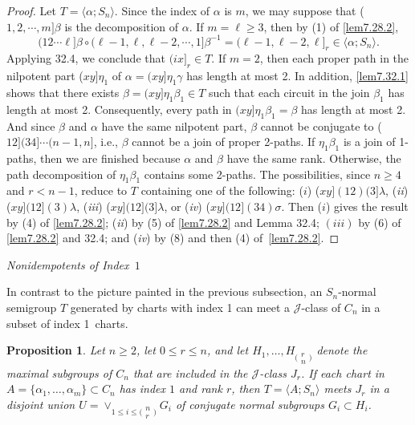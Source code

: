 \documentclass{surv-l}
\numberwithin{equation}{section}
\numberwithin{table}{section}
\numberwithin{figure}{section}
\newtheorem{proposition}[equation]{Proposition}
\theoremstyle{definition}
\begin{document}
\begin{proof} Let $T=\langle \alpha;S_{n}\rangle$. Since the index of $\alpha$ is
$m$, we may suppose that ($1, 2,\cdots,  m]\beta$ is the
decomposition of $\alpha$. If $m=\ell\geq 3$, then by (1) of
\ref{lem7.28.2},
\[
(12\cdots \ell]\beta\circ(\ell-1, \ell, \ell-2, \cdots, 1]\beta^{-1}=(\ell-1,
\ell-2, \ell]_{r}\in\langle\alpha;S_{n}\rangle.
\]
Applying 32.4, we conclude that $(ix]_{r}\in T$. If $m=2$, then
each proper path in the nilpotent part ($xy]\eta_{1}$ of
$\alpha=(xy]\eta_{1}\gamma$ has length at most 2. In addition,
\ref{lem7.32.1} shows that there exists
$\beta=(xy]\eta_{1}\beta_{1}\in T$ such that each circuit in the
join $\beta_{1}$ has length at most 2. Consequently, every path in
$(xy]\eta_{1}\beta_{1}=\beta$ has length at most 2. And since
$\beta$ and $\alpha$ have the same nilpotent part, $\beta$ cannot
be conjugate to ($12](34]\cdots(n-1, n]$, i.e., $\beta$ cannot be
a join of proper 2-paths. If $\eta_{1}\beta_{1}$ is a join of
1-paths, then we are finished because $\alpha$ and $\beta$ have
the same rank. Otherwise, the path decomposition of
$\eta_{1}\beta_{1}$ contains some 2-paths. The possibilities,
since $n \geq 4$ and $r <n -1$, reduce to $T$ containing one of
the following: ($i$) ($xy](12)(3]\lambda$, (\emph{ii})
($xy](12](3)\lambda$, (\emph{iii}) ($xy](12](3]\lambda$, or
(\emph{iv}) ($xy](12](34)\sigma$. Then ($i$) gives the result by
(4) of \ref{lem7.28.2}; (\emph{ii}) by (5) of \ref{lem7.28.2} and
Lemma 32.4; $(iii)$ by (6) of \ref{lem7.28.2} and 32.4; and
(\emph{iv}) by (8) and then (4) of~\ref{lem7.28.2}.
\end{proof}

\begin{center}
\emph{Nonidempotents of Index~$1$}
\end{center}

In contrast to the picture painted in the previous subsection, an
$S_{n}$-normal semigroup $T$ generated by charts with index 1 can
meet a $\mathcal{J}$-class of $C_{n}$ in a subset of index
1~charts.

\begin{proposition}\label{prop7.32.6}
Let $n \geq 2$, let $0\leq r\leq n$, and let $H_{1},\ldots,
H_{\big(\!\begin{smallmatrix}{r}\\ {n}\end{smallmatrix}\!\big)}$
denote the maximal subgroups of $C_{n}$ that are included in the
$\mathcal{J}$-class $J_{r}$. If each chart in $A =
\{\alpha_{1},\ldots, \alpha_{m}\}\subset C_{n}$ has index $1$ and
rank $r$, then $T=\langle A;S_{n}\rangle$ meets $J_{r}$ in a
disjoint union $U=\vee_{1\leq i\leq\big(\!\begin{smallmatrix}n\\
r\end{smallmatrix}\!\big)}G_{i}$ of conjugate normal subgroups
$G_{i}\subset H_{i}$.
\end{proposition}
\end{document}
